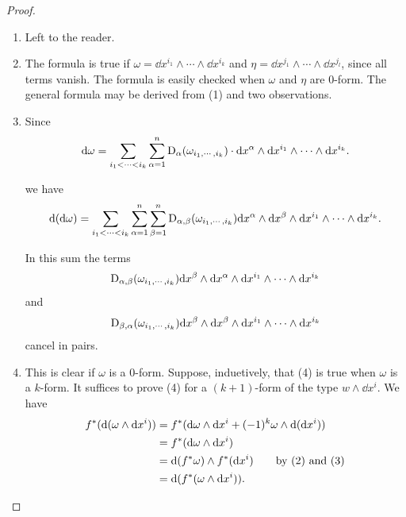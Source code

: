 \begin{proof}
  \begin{enumerate}[label=\upshape{(\arabic*)}]
    \item Left to the reader.
    \item The formula is true if $\omega = \dd x^{i_1}\wedge\cdots\wedge\dd x^{i_k}$ and 
      $\eta = \dd x^{j_1}\wedge\cdots\wedge\dd x^{j_l}$, since all terms vanish. The formula 
      is easily checked when $\omega$ and $\eta$ are 0-form. The general formula may be derived from (1)
      and two observations.
    \item Since 
      \begin{align*}
          \mathrm{d}\omega
          = \sum_{i_1<\cdots<i_k}^{}{\sum_{\alpha=1}^{n}{\mathrm{D}_\alpha(\omega_{i_1,\cdots,i_k})\cdot \mathrm{d} x^\alpha\wedge\mathrm{d} x^{i_1}\wedge\cdots\wedge\mathrm{d} x^{i_k}}}.
      \end{align*} 

      we have 
      \begin{align*}
          \mathrm{d}(\mathrm{d}\omega)
          = \sum_{i_1<\cdots<i_k}^{}{\sum_{\alpha=1}^{n}{\sum_{\beta=1}^{n} \mathrm{D}_{\alpha,\beta}(\omega_{i_1,\cdots,i_k})\mathrm{d} x^\alpha\wedge\mathrm{d} x^\beta\wedge\mathrm{d} x^{i_1}\wedge\cdots\wedge\mathrm{d} x^{i_k}}}.
      \end{align*}

      In this sum the terms 
      \begin{align*}
          \mathrm{D}_{\alpha,\beta}(\omega_{i_1,\cdots,i_k})\mathrm{d} x^\beta\wedge\mathrm{d} x^\alpha\wedge\mathrm{d} x^{i_1}\wedge\cdots\wedge\mathrm{d} x^{i_k}
      \end{align*}
      and 
      \begin{align*}
          \mathrm{D}_{\beta,\alpha}(\omega_{i_1,\cdots,i_k})\mathrm{d} x^\beta\wedge\mathrm{d} x^\beta\wedge\mathrm{d} x^{i_1}\wedge\cdots\wedge\mathrm{d} x^{i_k}
      \end{align*}
      cancel in pairs.
    \item This is clear if $\omega$ is a 0-form. Suppose, induetively, that
      (4) is true when $\omega$ is a $k$-form. It suffices to prove (4) for
      a $(k + 1)$-form of the type $w\wedge \dd x^i$. We have 
      \begin{align*}
          f^*(\mathrm{d}(\omega\wedge\mathrm{d} x^i))
          & = f^*(\mathrm{d}\omega\wedge\mathrm{d} x^i + (-1)^k\omega\wedge\mathrm{d}(\mathrm{d} x^i)) \\
          & = f^*(\mathrm{d}\omega\wedge \mathrm{d} x^i) \\
          & = \mathrm{d}(f^*\omega)\wedge f^*(\mathrm{d} x^i) \text{\qquad by (2) and (3)} \\
          & = \mathrm{d}(f^*(\omega\wedge\mathrm{d} x^i)).
      \end{align*}
  \end{enumerate}
\end{proof}

